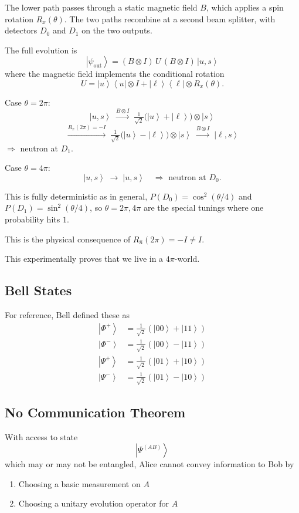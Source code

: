 \documentclass[
]{article}
\providecommand{\ket}[1]{\left\lvert #1 \right\rangle}
\providecommand{\bra}[1]{\left\langle #1 \right\rvert}
\begin{document}
The lower path passes through a static magnetic field $B$, which applies a spin rotation $R_x(\theta)$. The two paths recombine at a second beam splitter, with detectors $D_0$ and $D_1$ on the two outputs.

The full evolution is
\[
	\ket{\psi_{\text{out}}} = (B \otimes I)\, U\, (B \otimes I)\, \ket{u, s}
\]
where the magnetic field implements the conditional rotation
\[
	U = \ket{u}\bra{u} \otimes I + \ket{\ell}\bra{\ell} \otimes R_x(\theta).
\]

Case $\theta = 2\pi$:
\[
	\ket{u, s} \;\xrightarrow{B \otimes I}\; \tfrac{1}{\sqrt{2}}\bigl(\ket{u} + \ket{\ell}\bigr) \otimes \ket{s}
\]
\[
	\xrightarrow{R_x(2\pi) = -I}\; \tfrac{1}{\sqrt{2}}\bigl(\ket{u} - \ket{\ell}\bigr) \otimes \ket{s}
	\;\xrightarrow{B \otimes I}\; \ket{\ell, s}
\]
$\Rightarrow$ neutron at $D_1$.

Case $\theta = 4\pi$:
\[
	\ket{u, s} \;\longrightarrow\; \ket{u, s} \quad\Rightarrow\text{ neutron at } D_0.
\]

This is fully deterministic as in general, $P(D_0) = \cos^2(\theta/4)$ and $P(D_1) = \sin^2(\theta/4)$, so $\theta = 2\pi, 4\pi$ are the special tunings where one probability hits $1$.

This is the physical consequence of $R_{\hat{n}}(2\pi) = -I \neq I$.

This experimentally proves that we live in a $4\pi$-world.
\subsection{Bell States}\label{bell-states}
For reference, Bell defined these as
\[
	\begin{aligned}
		\ket{\Phi^+} & = \tfrac{1}{\sqrt{2}}\left(\ket{00} + \ket{11}\right) \\
		\ket{\Phi^-} & = \tfrac{1}{\sqrt{2}}\left(\ket{00} - \ket{11}\right) \\
		\ket{\Psi^+} & = \tfrac{1}{\sqrt{2}}\left(\ket{01} + \ket{10}\right) \\
		\ket{\Psi^-} & = \tfrac{1}{\sqrt{2}}\left(\ket{01} - \ket{10}\right)
	\end{aligned}
\]

\subsection{No Communication Theorem}\label{no-communication-theorem}
With access to state $$\ket{\Psi^{(AB)}}$$ which may or may not be entangled, Alice cannot convey information to Bob by
\begin{enumerate}
	\item Choosing a basic measurement on $A$
	\item Choosing a unitary evolution operator for $A$
\end{enumerate}
\end{document}
